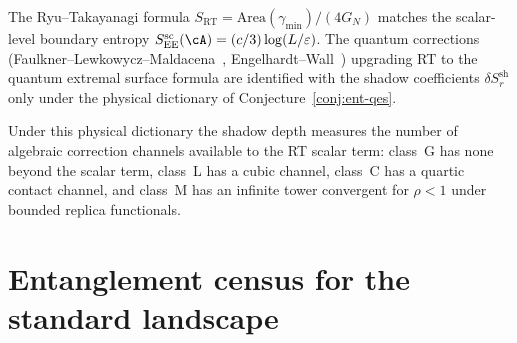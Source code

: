 \begin{remark}
\label{rem:ent-rt-scalar}
The Ryu--Takayanagi formula
$S_{\mathrm{RT}} = \mathrm{Area}(\gamma_{\min})/(4G_N)$
\cite{Ryu-Takayanagi06}
matches the scalar-level boundary entropy
$S_{\EE}^{\mathrm{sc}}(\cA) = (c/3)\log(L/\varepsilon)$.
The quantum corrections
(Faulkner--Lewkowycz--Maldacena~\cite{Faulkner-Lewkowycz-Maldacena13},
Engelhardt--Wall~\cite{Engelhardt-Wall14})
upgrading RT to the quantum extremal surface formula are
identified with the shadow coefficients
$\delta S_r^{\mathrm{sh}}$ only under the physical dictionary of
Conjecture~\ref{conj:ent-qes}.

Under this physical dictionary the shadow depth measures the
number of algebraic correction channels available to the RT scalar
term: class~G has none beyond the scalar term, class~L has a cubic
channel, class~C has a quartic contact channel, and class~M has an
infinite tower convergent for $\rho < 1$ under bounded replica
functionals.
\end{remark}

%
%

\section{Entanglement census for the standard landscape}
\label{sec:ent-standard-landscape}

